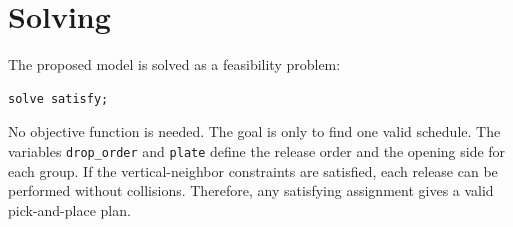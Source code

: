 \section{Solving}

The proposed model is solved as a feasibility problem:

\vspace{0.5cm}
\begin{lstlisting}
solve satisfy;
\end{lstlisting}
\vspace{0.5cm}
No objective function is needed. The goal is only to find one valid schedule.
The variables \texttt{drop\_order} and \texttt{plate} define the release order and
the opening side for each group.
If the vertical-neighbor constraints are satisfied, each release can be performed
without collisions. Therefore, any satisfying assignment gives a valid
pick-and-place plan.